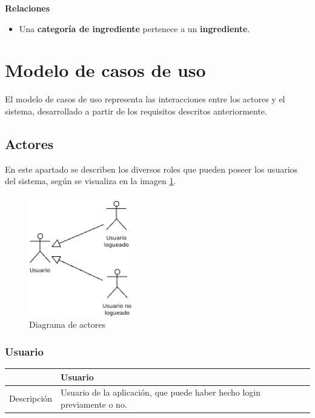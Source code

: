 \textbf{Relaciones}
\begin{itemize}
\item Una \textbf{categoría de ingrediente} pertenece a un \textbf{ingrediente}.
\end{itemize}




\section{Modelo de casos de uso}

El modelo de casos de uso representa las interacciones entre los actores y el
sistema, desarrollado a partir de los requisitos descritos anteriormente.

\subsection{Actores}


En este apartado se describen los diversos roles que pueden poseer los usuarios
del sistema, según se visualiza en la imagen \ref{fig:actores}.

\begin{figure}[h]
  \centering
  \includegraphics[width=0.4\textwidth]{cap4/img/diagrama_actores}
  \caption{Diagrama de actores}
  \label{fig:actores}
\end{figure}


\subsubsection{Usuario}

\begin{center}
  \begin{tabularx}{\textwidth}{|c|X|}
    \hline
     & Usuario \\

    \hline

    Descripción & Usuario de la aplicación, que puede haber hecho login
    previamente o no. \\

    \hline
  \end{tabularx}

\end{center}



